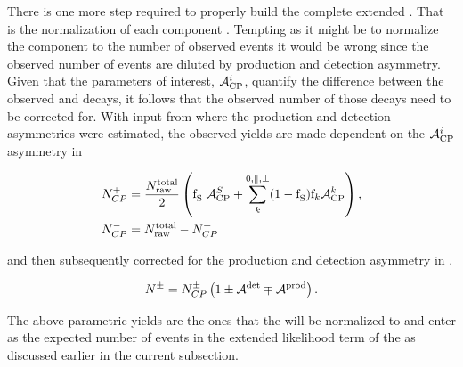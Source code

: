 There is one more step required to properly build the complete extended \pdf. That is the normalization of each component \pdf. Tempting as it might be to
normalize the component \pdfs to the number of observed events it would be wrong since the observed number of events are diluted by production and detection
asymmetry. Given that the parameters of interest, $\mathcal{A}_{\rm CP}^{i}$, quantify the difference between the observed \BsbarJpsiKst and \BsJpsiKst decays, it follows that
the observed  number of those decays need to be corrected for. With input from  where the production and detection
asymmetries were estimated, the observed yields are made dependent on the $\mathcal{A}_{\rm CP}^{i}$ asymmetry in 

\begin{subequations}
  \label{acp_yields}
  \begin{align}
    N^{+}_{CP} &= \frac{ N_{\text{raw}}^{\text{total}} }{2} \left( \text{f}_{\text{S}}^{}\; \mathcal{A}_{\rm CP}^{S} + \sum_k^{0,\parallel,\perp} (1-\text{f}_{\text{S}}^{})\text{f}_{k}\mathcal{A}_{\rm CP}^{k}  \right), \\
    N^{-}_{CP} &=  N_{\text{raw}}^{\text{total}} - N^{+}_{CP}
  \end{align}
\end{subequations}

\noindent and then subsequently corrected for the production and detection asymmetry in .

\begin{equation}
N^{\pm} = N^{\pm}_{CP}  \left( 1 \pm \mathcal{A}^{\text{det}} \mp \mathcal{A}^{\text{prod}} \right).
\label{norm_yields}
\end{equation}

\noindent The above parametric yields are the ones that the \pdfs will be normalized to and enter as the expected number of events in the extended
likelihood term of the \pdfs as discussed earlier in the current subsection.
